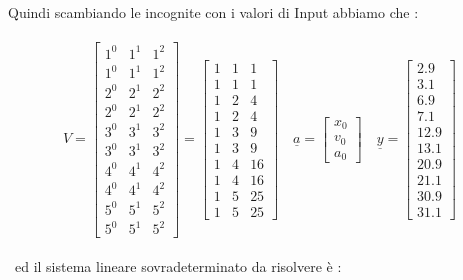 Quindi scambiando le incognite con i valori di Input abbiamo che :\\\
	\[
		V=\begin{bmatrix}
			1^0 & 1^1 & 1^2 \\
			1^0 & 1^1 & 1^2 \\
			2^0 & 2^1 & 2^2 \\
			2^0 & 2^1 & 2^2 \\
			3^0 & 3^1 & 3^2 \\
			3^0 & 3^1 & 3^2 \\
			4^0 & 4^1 & 4^2 \\
			4^0 & 4^1 & 4^2 \\
			5^0 & 5^1 & 5^2 \\
			5^0 & 5^1 & 5^2 				
		\end{bmatrix}
		=\begin{bmatrix}
			1 & 1 & 1 \\
			1 & 1 & 1 \\
			1 & 2 & 4 \\
			1 & 2 & 4 \\
			1 & 3 & 9 \\
			1 & 3 & 9 \\
			1 & 4 & 16 \\
			1 & 4 & 16 \\
			1 & 5 & 25 \\
			1 & 5 & 25 				
		\end{bmatrix} 
		\quad
		\underline{a}=\begin{bmatrix}
			x_0 \\
			v_0 \\
			a_0
		\end{bmatrix}
		\quad
		\underline{y}=\begin{bmatrix}
			2.9 \\
			3.1 \\
			6.9 \\
			7.1 \\
			12.9 \\
			13.1 \\
			20.9 \\
			21.1 \\
			30.9 \\
			31.1
		\end{bmatrix}
	\]\\\
ed il sistema lineare sovradeterminato da risolvere è :\\\
